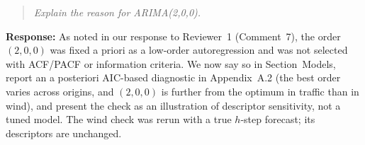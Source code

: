 \documentclass[11pt,a4paper]{article}
\newenvironment{reviewcomment}
  {\begin{quote}\itshape}
  {\end{quote}}
\newcommand{\response}{\noindent\textbf{Response:} }
\begin{document}
\begin{reviewcomment}
Explain the reason for ARIMA(2,0,0).
\end{reviewcomment}

\response
As noted in our response to Reviewer~1 (Comment~7), the order $(2,0,0)$ was fixed
a priori as a low-order autoregression and was not selected with ACF/PACF or
information criteria. We now say so in Section~Models, report an a posteriori
AIC-based diagnostic in Appendix~A.2 (the best order varies across origins, and
$(2,0,0)$ is further from the optimum in traffic than in wind), and present the
check as an illustration of descriptor sensitivity, not a tuned model. The
wind check was rerun with a true $h$-step forecast; its descriptors are
unchanged.
\end{document}
